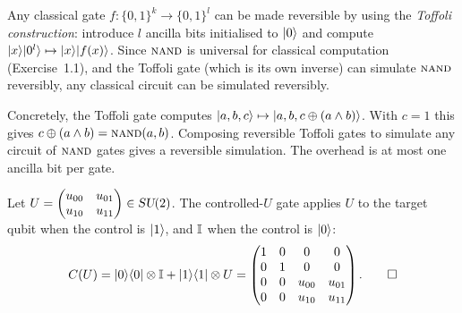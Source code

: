 \documentclass[12pt,oneside]{amsart}
\begin{document}
\begin{exercise}
\end{exercise}
\begin{solution}
  Any classical gate $f:\{0,1\}^k\to\{0,1\}^l$ can be made reversible by
  using the \emph{Toffoli construction}: introduce $l$ ancilla bits
  initialised to $|0\rangle$ and compute
  $|x\rangle|0^l\rangle\mapsto|x\rangle|f(x)\rangle$.  Since
  $\textsc{nand}$ is universal for classical computation (Exercise~1.1), and the
  Toffoli gate (which is its own inverse) can simulate $\textsc{nand}$
  reversibly, any classical circuit can be simulated reversibly.

  Concretely, the Toffoli gate computes
  $|a,b,c\rangle\mapsto|a,b,c\oplus(a\wedge b)\rangle$.  With $c=1$ this gives
  $c\oplus(a\wedge b) = \textsc{nand}(a,b)$.  Composing reversible Toffoli gates to
  simulate any circuit of $\textsc{nand}$ gates gives a reversible simulation. The
  overhead is at most one ancilla bit per gate.
\end{solution}

\begin{exercise}
\end{exercise}
\begin{solution}
  Let $U = \begin{pmatrix} u_{00} & u_{01} \\ u_{10} & u_{11}\end{pmatrix}
  \in \textsl{SU}(2)$.  The controlled-$U$ gate applies $U$ to the target qubit
  when the control is $|1\rangle$, and $\mathbb{I}$ when the control is $|0\rangle$:
  \[
    C(U) = |0\rangle\langle0|\otimes \mathbb{I} + |1\rangle\langle1|\otimes U
    = \begin{pmatrix}
      1 & 0 & 0 & 0 \\
      0 & 1 & 0 & 0 \\
      0 & 0 & u_{00} & u_{01} \\
      0 & 0 & u_{10} & u_{11}
    \end{pmatrix}.
    \qedhere
  \]
\end{solution}
\end{document}
